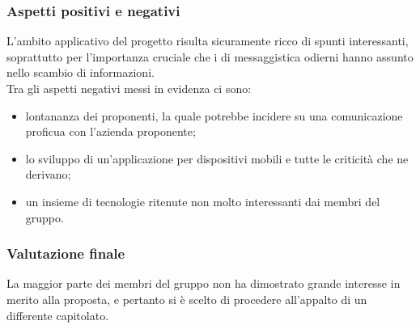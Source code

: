 		\subsubsection{Aspetti positivi e negativi}
		L'ambito applicativo del progetto risulta sicuramente ricco di spunti interessanti, soprattutto per l'importanza cruciale che i  di 
		messaggistica odierni hanno assunto nello scambio di informazioni.
		\\Tra gli aspetti negativi messi in evidenza ci sono:
		\begin{itemize}
			\item lontananza dei proponenti, la quale potrebbe incidere su una comunicazione proficua con l'azienda proponente;
			\item lo sviluppo di un'applicazione per dispositivi mobili e tutte le criticità che ne derivano;
			\item un insieme di tecnologie ritenute non molto interessanti dai membri del gruppo.
		\end{itemize}
		\subsubsection{Valutazione finale}
		La maggior parte dei membri del gruppo non ha dimostrato grande interesse in merito alla proposta, e pertanto si è scelto di procedere 
		all'appalto di un differente capitolato.


